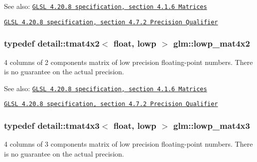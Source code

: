 \begin{Desc}
\item[See also:]\href{http://www.opengl.org/registry/doc/GLSLangSpec.4.20.8.pdf}{\tt GLSL 4.20.8 specification, section 4.1.6 Matrices} 

\href{http://www.opengl.org/registry/doc/GLSLangSpec.4.20.8.pdf}{\tt GLSL 4.20.8 specification, section 4.7.2 Precision Qualifier} \end{Desc}
\hypertarget{group__core__precision_g2cfe24ae14da17f3510acfc3d03e05a5}{
\subsubsection[lowp\_\-mat4x2]{\setlength{\rightskip}{0pt plus 5cm}typedef detail::tmat4x2$<$ float, lowp $>$ {\bf glm::lowp\_\-mat4x2}}}
\label{group__core__precision_g2cfe24ae14da17f3510acfc3d03e05a5}


4 columns of 2 components matrix of low precision floating-point numbers. There is no guarantee on the actual precision.

\begin{Desc}
\item[See also:]\href{http://www.opengl.org/registry/doc/GLSLangSpec.4.20.8.pdf}{\tt GLSL 4.20.8 specification, section 4.1.6 Matrices} 

\href{http://www.opengl.org/registry/doc/GLSLangSpec.4.20.8.pdf}{\tt GLSL 4.20.8 specification, section 4.7.2 Precision Qualifier} \end{Desc}
\hypertarget{group__core__precision_gda92d0baf15002240dd6f638c57f9fec}{
\subsubsection[lowp\_\-mat4x3]{\setlength{\rightskip}{0pt plus 5cm}typedef detail::tmat4x3$<$ float, lowp $>$ {\bf glm::lowp\_\-mat4x3}}}
\label{group__core__precision_gda92d0baf15002240dd6f638c57f9fec}


4 columns of 3 components matrix of low precision floating-point numbers. There is no guarantee on the actual precision.

